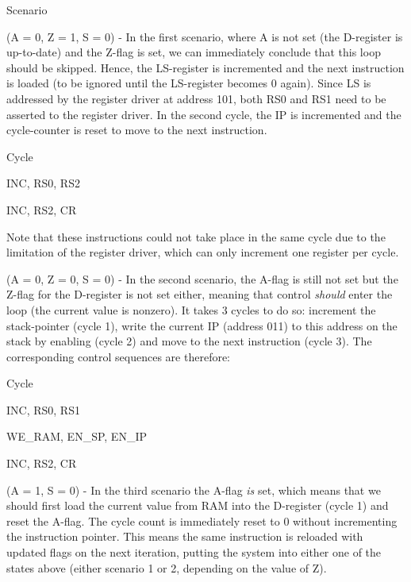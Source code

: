 \begin{labeledenum}{Scenario}
  \item (A = 0, Z = 1, S = 0) - In the first scenario, where A is not set (the D-register is up-to-date) and the Z-flag is set, we can immediately conclude that this loop should be skipped. Hence, the LS-register is incremented and the next instruction is loaded (to be ignored until the LS-register becomes 0 again). Since LS is addressed by the register driver at address 101, both RS0 and RS1 need to be asserted to the register driver. In the second cycle, the IP is incremented and the cycle-counter is reset to move to the next instruction.

    \begin{labeledenum}{Cycle}
      \item INC, RS0, RS2
      \item INC, RS2, CR
    \end{labeledenum}
    Note that these instructions could not take place in the same cycle due to the limitation of the register driver, which can only increment one register per cycle.
    

  \item (A = 0, Z = 0, S = 0) - In the second scenario, the A-flag is still not set but the Z-flag for the D-register is not set either, meaning that control \emph{should} enter the loop (the current value is nonzero). It takes 3 cycles to do so: increment the stack-pointer (cycle 1), write the current IP (address 011) to this address on the stack by enabling (cycle 2) and move to the next instruction (cycle 3). The corresponding control sequences are therefore:

    \begin{labeledenum}{Cycle}
    \item INC, RS0, RS1
    \item WE\_RAM, EN\_SP, EN\_IP
    \item INC, RS2, CR
    \end{labeledenum}

  \item (A = 1, S = 0) - In the third scenario the A-flag \emph{is} set, which means that we should first load the current value from RAM into the D-register (cycle 1) and reset the A-flag. The cycle count is immediately reset to 0 without incrementing the instruction pointer. This means the same instruction is reloaded with updated flags on the next iteration, putting the system into either one of the states above (either scenario 1 or 2, depending on the value of Z).


\end{labeledenum}
